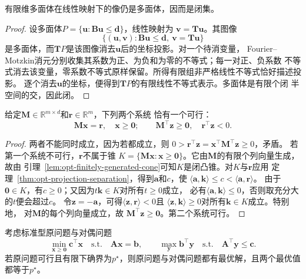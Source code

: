 \begin{lemma}[有限维多面体的线性像]
\label{lem:opt-polyhedral-image}
有限维多面体在线性映射下的像仍是多面体，因而是闭集。
\end{lemma}

\begin{proof}
设多面体$P=\{\bm{u}:\bm{B}\bm{u}\leq\bm{d}\}$，线性映射为
$\bm{v}=\bm{T}\bm{u}$。其图像
\[
  \{(\bm{u},\bm{v}):\bm{B}\bm{u}\leq\bm{d},\
  \bm{v}=\bm{T}\bm{u}\}
\]
是多面体，而$\bm{T}P$是该图像消去$\bm{u}$后的坐标投影。对一个待消变量，
Fourier--Motzkin消元分别收集其系数为正、为负和为零的不等式；每一对正、负系数
不等式消去该变量，零系数不等式原样保留。所得有限组非严格线性不等式恰好描述投影。
逐个消去$\bm{u}$的坐标，便得到$\bm{T}P$的有限线性不等式表示。多面体是有限个闭
半空间的交，因此闭。
\end{proof}

\begin{theorem}[Farkas择一定理]
\label{thm:opt-farkas}
给定$\bm{M}\in\mathbb{R}^{m\times d}$和$\bm{r}\in\mathbb{R}^m$，下列两个系统
恰有一个可行：
\[
  \bm{M}\bm{x}=\bm{r},\quad\bm{x}\geq\bm{0};
  \qquad
  \bm{M}^{\top}\bm{z}\geq\bm{0},\quad
  \bm{r}^{\top}\bm{z}<0.
\]
\end{theorem}

\begin{proof}
两者不能同时成立，因为若都成立，则
$0>\bm{r}^{\top}\bm{z}
=\bm{x}^{\top}\bm{M}^{\top}\bm{z}\geq0$，矛盾。
若第一个系统不可行，$\bm{r}$不属于锥
$K=\{\bm{M}\bm{x}:\bm{x}\geq\bm{0}\}$。它由$\bm{M}$的有限个列向量生成，故由
引理~\ref{lem:opt-finitely-generated-cone}可知$K$是闭凸锥。对$K$与$\bm{r}$应用
定理~\ref{thm:opt-projection-separation}，得到$\bm{a}$和$c$，使
$\langle\bm{a},\bm{k}\rangle\leq c<\langle\bm{a},\bm{r}\rangle$。
由于$\bm{0}\in K$，有$c\geq0$；又因为$t\bm{k}\in K$对所有$t\geq0$成立，
必有$\langle\bm{a},\bm{k}\rangle\leq0$，否则取充分大的$t$便会超过$c$。
令$\bm{z}=-\bm{a}$，可得$\langle\bm{z},\bm{r}\rangle<0$且
$\langle\bm{z},\bm{k}\rangle\geq0$对所有$\bm{k}\in K$成立。特别地，
对$\bm{M}$的每个列向量成立，故
$\bm{M}^{\top}\bm{z}\geq\bm{0}$。第二个系统可行。
\end{proof}

\begin{theorem}[有限维线性规划强对偶]
\label{thm:opt-lp-strong-duality}
考虑标准型原问题与对偶问题
\[
  \min_{\bm{x}\geq\bm{0}}\bm{c}^{\top}\bm{x}
  \quad\text{s.t.}\quad\bm{A}\bm{x}=\bm{b},
  \qquad
  \max_{\bm{y}}\bm{b}^{\top}\bm{y}
  \quad\text{s.t.}\quad\bm{A}^{\top}\bm{y}\leq\bm{c}.
\]
若原问题可行且有限下确界为$p^\star$，则原问题与对偶问题都有最优解，且两个最优值
都等于$p^\star$。
\end{theorem}

